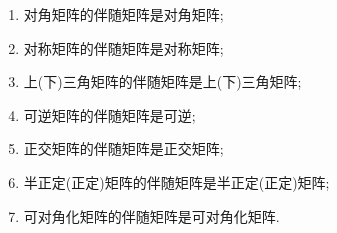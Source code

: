 \documentclass[lang=cn,newtx,10pt,scheme=chinese]{elegantbook}
\begin{document}
\begin{proposition}[伴随矩阵的继承性]\label{proposition:伴随矩阵的继承性}
\begin{enumerate}
\item\label{伴随矩阵的继承性1} 对角矩阵的伴随矩阵是对角矩阵;

\item 对称矩阵的伴随矩阵是对称矩阵;

\item 上(下)三角矩阵的伴随矩阵是上(下)三角矩阵;

\item 可逆矩阵的伴随矩阵是可逆;

\item 正交矩阵的伴随矩阵是正交矩阵;

\item 半正定(正定)矩阵的伴随矩阵是半正定(正定)矩阵;

\item 可对角化矩阵的伴随矩阵是可对角化矩阵.
\end{enumerate}
\end{proposition}
\end{document}
